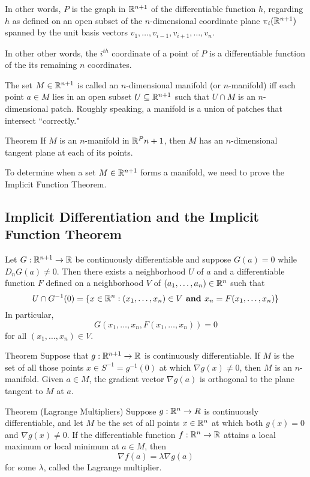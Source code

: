 In other words, $P$ is the graph in $\mathbb{R}^{n+1}$ of the differentiable function $h$, regarding $h$ as defined on an open subset of the $n$-dimensional coordinate plane $\pi_i(\mathbb{R}^{n+1})$ spanned by the unit basis vectors $v_1, \ldots, v_{i-1}, v_{i+1}, \ldots, v_n$.

In other other words, the $i^{th}$ coordinate of a point of $P$ is a differentiable function of the its remaining $n$ coordinates.

The set $M \in \mathbb{R}^{n+1}$ is called an $n$-dimensional manifold (or $n$-manifold) iff each point $a \in M$ lies in an open subset $U \subseteq \mathbb{R}^{n+1}$ such that $U \cap M$ is an $n$-dimensional patch. Roughly speaking, a manifold is a union of patches that intersect ``correctly."

Theorem If $M$ is an $n$-manifold in $\mathbb{R}^P{n+1}$, then $M$ has an $n$-dimensional tangent plane at each of its points.

To determine when a set $M \in \mathbb{R}^{n+1}$ forms a manifold, we need to prove the Implicit Function Theorem.

\subsection{Implicit Differentiation and the Implicit Function Theorem}

Let $G : \mathbb{R}^{n+1} \to \mathbb{R}$ be continuously differentiable and suppose $G(a) = 0$ while $D_nG(a) \neq 0$. Then there exists a neighborhood $U$ of $a$ and a differentiable function $F$ defined on a neighborhood $V$ of $(a_1, \ldots, a_n) \in \mathbb{R}^n$ such that $$ U \cap G^{-1}(0) = \{ x \in \mathbb{R}^n : (x_1, \ldots, x_n) \in V \textbf{ and } x_n = F(x_1, \ldots, x_n)\}$$ In particular, $$ G(x_1, \ldots, x_n, F(x_1, \ldots, x_n)) = 0 $$ for all $(x_1, \ldots, x_n) \in V$.

Theorem Suppose that $g : \mathbb{R}^{n+1} \to \mathbb{R}$ is continuously differentiable. If $M$ is the set of all those points $x \in S^{-1} = g^{-1}(0)$ at which $\nabla g(x) \neq 0$, then $M$ is an $n$-manifold. Given $a \in M$, the gradient vector $\nabla g(a)$ is orthogonal to the plane tangent to $M$ at $a$.

Theorem (Lagrange Multipliers) Suppose $g: \mathbb{R}^n \to R$ is continuously differentiable, and let $M$ be the set of all points $x \in \mathbb{R}^n$ at which both $g(x) = 0$ and $\nabla g(x) \neq 0$. If the differentiable function $f : \mathbb{R}^n \to \mathbb{R}$ attains a local maximum or local minimum at $a \in M$, then $$\nabla f(a) = \lambda \nabla g(a) $$ for some $\lambda$, called the Lagrange multiplier.

